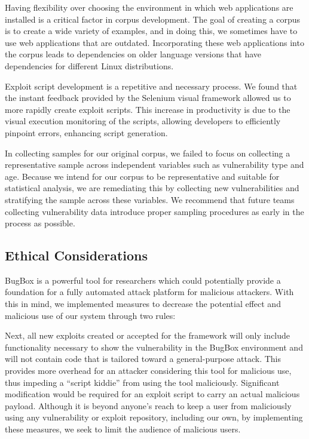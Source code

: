 \documentclass[letterpaper,twocolumn,10pt]{article}
\begin{document}
Having flexibility over choosing the environment in which web applications are installed is a critical factor in corpus development.  The goal of creating a corpus is to create a wide variety of examples, and in doing this, we sometimes have to use web applications that are outdated.  Incorporating these web applications into the corpus leads to dependencies on older language versions that have dependencies for different Linux distributions.\par

Exploit script development is a repetitive and necessary process. We found that the instant feedback provided by the Selenium visual framework allowed us to more rapidly create exploit scripts.  This increase in productivity is due to the visual execution monitoring of the scripts, allowing developers to efficiently pinpoint errors, enhancing script generation.  \par

In collecting samples for our original corpus, we failed to focus on collecting a representative sample across independent variables such as vulnerability type and age. Because we intend for our corpus to be representative and suitable for statistical analysis, we are remediating this by collecting new vulnerabilities and stratifying the sample across these variables. We recommend that future teams collecting vulnerability data introduce proper sampling procedures as early in the process as possible.\par

\subsection {Ethical Considerations}
BugBox is a powerful tool for researchers which could potentially provide a foundation for a fully automated attack platform for malicious attackers.  With this in mind, we implemented measures to decrease the potential effect and malicious use of our system through two rules:

Next, all new exploits created or accepted for the framework will only include functionality necessary to show the vulnerability in the BugBox environment and will not contain code that is tailored toward a general-purpose attack.  This provides more overhead for an attacker considering this tool for malicious use, thus impeding a ``script kiddie'' from using the tool maliciously.  Significant modification would be required for an exploit script to carry an actual malicious payload.
Although it is beyond anyone's reach to keep a user from maliciously using any vulnerability or exploit repository, including our own, by implementing these measures, we seek to limit the audience of malicious users.
\end{document}
